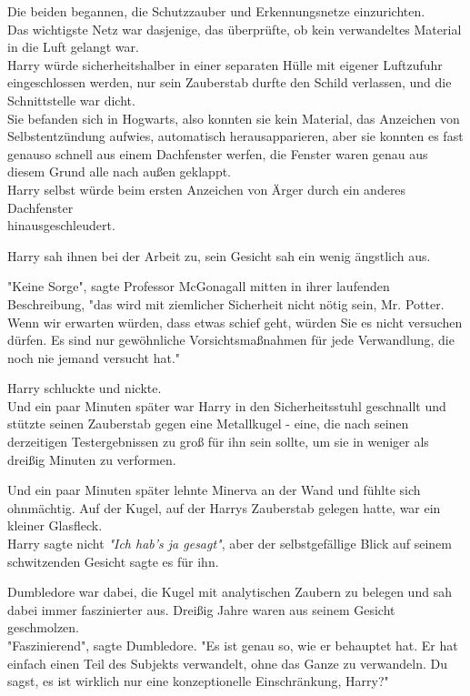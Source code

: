 {Die beiden begannen, die Schutzzauber und Erkennungsnetze einzurichten.\\ Das wichtigste Netz war dasjenige, das überprüfte, ob kein verwandeltes Material in die Luft gelangt war.\\ Harry würde sicherheitshalber in einer separaten Hülle mit eigener Luftzufuhr eingeschlossen werden, nur sein Zauberstab durfte den Schild verlassen, und die Schnittstelle war dicht.\\ Sie befanden sich in Hogwarts, also konnten sie kein Material, das Anzeichen von Selbstentzündung aufwies, automatisch herausapparieren, aber sie konnten es fast genauso schnell aus einem Dachfenster werfen, die Fenster waren genau aus diesem Grund alle nach außen geklappt.\\ Harry selbst würde beim ersten Anzeichen von Ärger durch ein anderes Dachfenster\\ hinausgeschleudert.

Harry sah ihnen bei der Arbeit zu, sein Gesicht sah ein wenig ängstlich aus.

"Keine Sorge", sagte Professor McGonagall mitten in ihrer laufenden Beschreibung, "das wird mit ziemlicher Sicherheit nicht nötig sein, Mr. Potter. Wenn wir erwarten würden, dass etwas schief geht, würden Sie es nicht versuchen dürfen. Es sind nur gewöhnliche Vorsichtsmaßnahmen für jede Verwandlung, die noch nie jemand versucht hat."

Harry schluckte und nickte.\\ Und ein paar Minuten später war Harry in den Sicherheitsstuhl geschnallt und stützte seinen Zauberstab gegen eine Metallkugel - eine, die nach seinen derzeitigen Testergebnissen zu groß für ihn sein sollte, um sie in weniger als dreißig Minuten zu verformen.

Und ein paar Minuten später lehnte Minerva an der Wand und fühlte sich ohnmächtig. Auf der Kugel, auf der Harrys Zauberstab gelegen hatte, war ein kleiner Glasfleck.\\ Harry sagte nicht \emph{"Ich hab's ja gesagt"}, aber der selbstgefällige Blick auf seinem schwitzenden Gesicht sagte es für ihn.

Dumbledore war dabei, die Kugel mit analytischen Zaubern zu belegen und sah dabei immer faszinierter aus. Dreißig Jahre waren aus seinem Gesicht geschmolzen.\\ "Faszinierend", sagte Dumbledore. "Es ist genau so, wie er behauptet hat. Er hat einfach einen Teil des Subjekts verwandelt, ohne das Ganze zu verwandeln. Du sagst, es ist wirklich nur eine konzeptionelle Einschränkung, Harry?"

}

